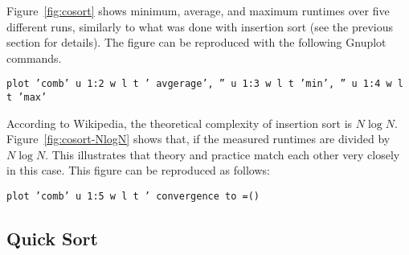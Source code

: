 \documentclass[a4paper,10pt]{article}
\begin{document}
Figure~\ref{fig:cosort} shows minimum, average, and maximum runtimes over five different runs, similarly to what was done with insertion sort (see the previous section for details).
The figure can be reproduced with the following Gnuplot commands.

\smallskip
 \texttt{plot 'comb' u 1:2 w l t ' avgerage', '' u 1:3 w l t 'min', '' u 1:4 w l t 'max'}
\smallskip

According to Wikipedia, the theoretical complexity of insertion sort is $N \log N$.
Figure~\ref{fig:cosort-NlogN} shows that, if the measured runtimes are divided by $N \log N$.
This illustrates that theory and practice match each other very closely in this case.
This figure can be reproduced as follows:

\smallskip
 \texttt{plot 'comb' u 1:5 w l t ' convergence to =()}
\smallskip


\subsection*{Quick Sort}
\end{document}
